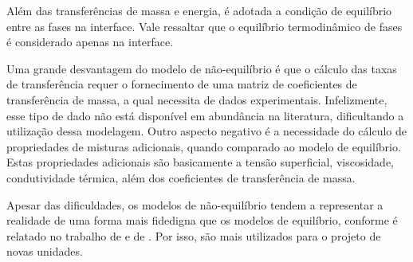 \begin{enumerate}
Além das transferências de massa e energia, é adotada a condição de equilíbrio entre as fases na interface.
Vale ressaltar que o equilíbrio
termodinâmico de fases é considerado apenas na interface.

Uma grande desvantagem do modelo de não-equilíbrio é que o cálculo das taxas de
transferência requer o fornecimento de uma matriz de coeficientes de
transferência de massa, a qual necessita de dados experimentais. Infelizmente, esse
tipo de dado não está disponível em abundância na literatura, dificultando a utilização dessa modelagem.
Outro aspecto negativo é a necessidade do cálculo de propriedades de
misturas adicionais, quando comparado ao modelo de equilíbrio.
Estas propriedades adicionais são basicamente a tensão superficial,
viscosidade, condutividade térmica, além dos coeficientes de transferência de
massa.

Apesar das dificuldades, os modelos de não-equilíbrio tendem a representar a realidade de uma forma mais fidedigna que os
modelos de equilíbrio, conforme é relatado no trabalho de  e de . Por isso,
são mais utilizados para o projeto de novas unidades.


\end{enumerate}
